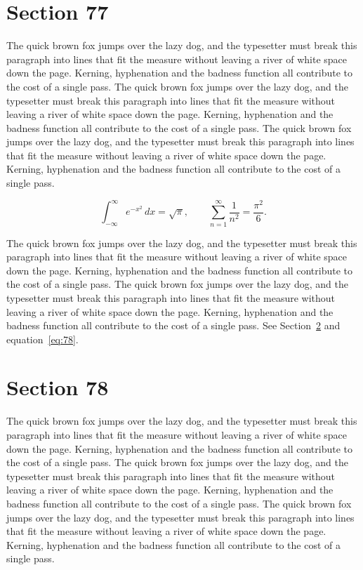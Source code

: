 \documentclass{article}
\begin{document}
\section{Section 77}
\label{sec:77}
The quick brown fox jumps over the lazy dog, and the typesetter must break this paragraph into lines that fit the measure without leaving a river of white space down the page. Kerning, hyphenation and the badness function all contribute to the cost of a single pass. The quick brown fox jumps over the lazy dog, and the typesetter must break this paragraph into lines that fit the measure without leaving a river of white space down the page. Kerning, hyphenation and the badness function all contribute to the cost of a single pass. The quick brown fox jumps over the lazy dog, and the typesetter must break this paragraph into lines that fit the measure without leaving a river of white space down the page. Kerning, hyphenation and the badness function all contribute to the cost of a single pass. 

\begin{equation}\label{eq:77}
\int_{-\infty}^{\infty} e^{-x^{2}}\,dx = \sqrt{\pi}, \qquad
\sum_{n=1}^{\infty} \frac{1}{n^{2}} = \frac{\pi^{2}}{6}.
\end{equation}

The quick brown fox jumps over the lazy dog, and the typesetter must break this paragraph into lines that fit the measure without leaving a river of white space down the page. Kerning, hyphenation and the badness function all contribute to the cost of a single pass. The quick brown fox jumps over the lazy dog, and the typesetter must break this paragraph into lines that fit the measure without leaving a river of white space down the page. Kerning, hyphenation and the badness function all contribute to the cost of a single pass. 
See Section~\ref{sec:78} and equation~\eqref{eq:78}.
\section{Section 78}
\label{sec:78}
The quick brown fox jumps over the lazy dog, and the typesetter must break this paragraph into lines that fit the measure without leaving a river of white space down the page. Kerning, hyphenation and the badness function all contribute to the cost of a single pass. The quick brown fox jumps over the lazy dog, and the typesetter must break this paragraph into lines that fit the measure without leaving a river of white space down the page. Kerning, hyphenation and the badness function all contribute to the cost of a single pass. The quick brown fox jumps over the lazy dog, and the typesetter must break this paragraph into lines that fit the measure without leaving a river of white space down the page. Kerning, hyphenation and the badness function all contribute to the cost of a single pass. 
\end{document}
